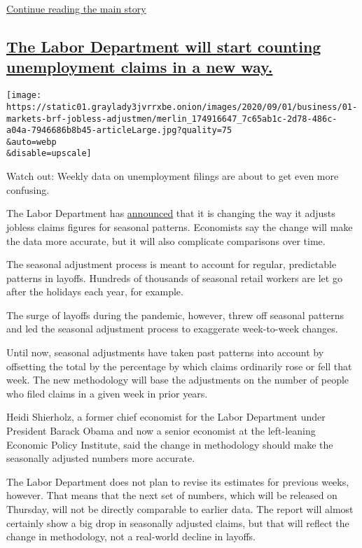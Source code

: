 \protect\hyperlink{after-dfp-ad-mid2}{Continue reading the main story}

\hypertarget{the-labor-department-will-start-counting-unemployment-claims-in-a-new-way}{%
\subsection{\texorpdfstring{\protect\hyperlink{the-labor-department-will-start-counting-unemployment-claims-in-a-new-way}{The
Labor Department will start counting unemployment claims in a new
way.}}{The Labor Department will start counting unemployment claims in a new way.}}\label{the-labor-department-will-start-counting-unemployment-claims-in-a-new-way}}

\texttt{[image: https://static01.graylady3jvrrxbe.onion/images/2020/09/01/business/01-markets-brf-jobless-adjustmen/merlin\_174916647\_7c65ab1c-2d78-486c-a04a-7946686b8b45-articleLarge.jpg?quality=75\\\&auto=webp\\\&disable=upscale]}

Watch out: Weekly data on unemployment filings are about to get even
more confusing.

The Labor Department has
\href{https://oui.doleta.gov/press/2020/082720.pdf}{announced} that it
is changing the way it adjusts jobless claims figures for seasonal
patterns. Economists say the change will make the data more accurate,
but it will also complicate comparisons over time.

The seasonal adjustment process is meant to account for regular,
predictable patterns in layoffs. Hundreds of thousands of seasonal
retail workers are let go after the holidays each year, for example.

The surge of layoffs during the pandemic, however, threw off seasonal
patterns and led the seasonal adjustment process to exaggerate
week-to-week changes.

Until now, seasonal adjustments have taken past patterns into account by
offsetting the total by the percentage by which claims ordinarily rose
or fell that week. The new methodology will base the adjustments on the
number of people who filed claims in a given week in prior years.

Heidi Shierholz, a former chief economist for the Labor Department under
President Barack Obama and now a senior economist at the left-leaning
Economic Policy Institute, said the change in methodology should make
the seasonally adjusted numbers more accurate.

The Labor Department does not plan to revise its estimates for previous
weeks, however. That means that the next set of numbers, which will be
released on Thursday, will not be directly comparable to earlier data.
The report will almost certainly show a big drop in seasonally adjusted
claims, but that will reflect the change in methodology, not a
real-world decline in layoffs.

